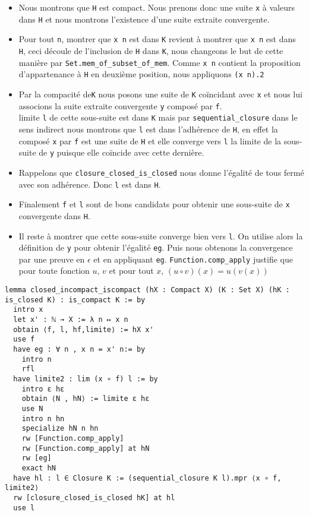 \documentclass[a4paper, 12pt]{article}
\newcommand{\lean}[1]{\texttt{#1}}
\begin{document}
\begin{itemize}
    \item Nous montrons que \lean{H} est compact. Nous prenons donc une suite \lean{x} à valeurs dans \lean{H} et nous montrons l'existence d'une suite extraite convergente.

    \item Pour tout \lean{n}, montrer que \lean{x n} est dans \lean{K} revient à montrer que \lean{x n} est dans \lean{H}, ceci découle de l'inclusion de \lean{H} dans \lean{K}, nous changeons le but de cette manière par \lean{Set.mem_of_subset_of_mem}. Comme \lean{x n} contient la proposition d'appartenance à \lean{H} en deuxième position, nous appliquons \lean{(x n).2}\\

    \item Par la compacité de\lean{K} nous posons une suite de \lean{K} coïncidant avec \lean{x} et nous lui associons la suite extraite convergente \lean{y} composé par \lean{f}.\\

    \itemLa limite \lean{l} de cette sous-suite est dans \lean{K} mais par \lean{sequential_closure} dans le sens indirect nous montrons que \lean{l} est dans l'adhérence de \lean{H}, en effet la composé \lean{x} par \lean{f} est une suite de \lean{H} et elle converge vers \lean{l} la limite de la sous-suite de \lean{y} puisque elle coïncide avec cette dernière.\\

    \item Rappelons que \lean{closure_closed_is_closed} nous donne l'égalité de tous fermé avec son adhérence. Donc \lean{l} est dans \lean{H}.\\

    \item Finalement \lean{f} et \lean{l} sont de bons candidats pour obtenir une sous-suite de \lean{x} convergente dans \lean{H}.\\

    \item Il reste à montrer que cette sous-suite converge bien vers \lean{l}. On utilise alors la définition de \lean{y} pour obtenir l'égalité \lean{eg}. Puis nous obtenons la
    convergence par une preuve en $\epsilon$ et en appliquant \lean{eg}. \lean{Function.comp_apply} justifie que pour toute fonction $u$, $v$ et pour tout $x$, $(u \circ v) (x) = u(v(x))$
\end{itemize}

\begin{verbatim}
lemma closed_incompact_iscompact (hX : Compact X) (K : Set X) (hK : is_closed K) : is_compact K := by
  intro x
  let x' : ℕ → X := λ n ↦ x n
  obtain ⟨f, l, hf,limite⟩ := hX x'
  use f
  have eg : ∀ n , x n = x' n:= by
    intro n
    rfl
  have limite2 : lim (x ∘ f) l := by
    intro ε hε
    obtain ⟨N , hN⟩ := limite ε hε
    use N
    intro n hn
    specialize hN n hn
    rw [Function.comp_apply]
    rw [Function.comp_apply] at hN
    rw [eg]
    exact hN
  have hl : l ∈ Closure K := (sequential_closure K l).mpr ⟨x ∘ f, limite2⟩
  rw [closure_closed_is_closed hK] at hl
  use l
\end{verbatim}
\end{document}
